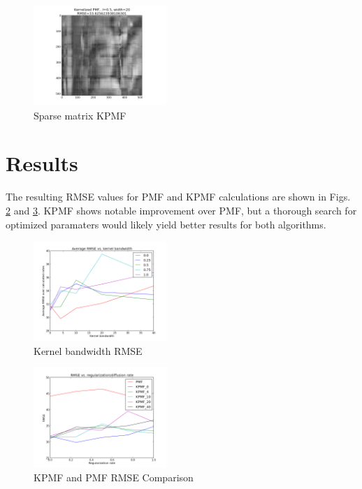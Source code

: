 \documentclass[journal]{IEEEtran}
\begin{document}
\begin{figure}[h!]
\centering
    \includegraphics[width=0.45\textwidth]{sparsekpmf.png}
    \caption{Sparse matrix KPMF}
    \label{fig:sparsekpmf}
\end{figure}

\section{Results}
The resulting RMSE values for PMF and KPMF calculations are shown in Figs. \ref{fig:kernelrmse} and \ref{fig:regdiffrmse}. KPMF shows notable improvement over
PMF, but a thorough search for optimized paramaters would likely yield better results for both algorithms.
\begin{figure}[h!]
\centering
    \includegraphics[width=0.45\textwidth]{kernelrmse.png}
    \caption{Kernel bandwidth RMSE}
    \label{fig:kernelrmse}
\end{figure}
\begin{figure}[h!]
\centering
    \includegraphics[width=0.45\textwidth]{regdiffrmse.png}
    \caption{KPMF and PMF RMSE Comparison}
    \label{fig:regdiffrmse}
\end{figure}
\end{document}
